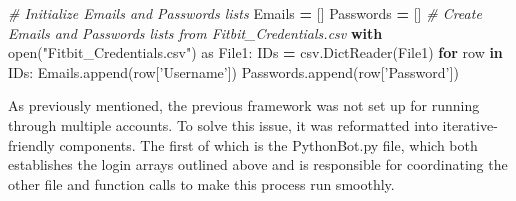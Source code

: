 \documentclass[]{book}
\newenvironment{Shaded}{\begin{snugshade}}{\end{snugshade}}
\newcommand{\KeywordTok}[1]{\textcolor[rgb]{0.13,0.29,0.53}{\textbf{#1}}}
\newcommand{\StringTok}[1]{\textcolor[rgb]{0.31,0.60,0.02}{#1}}
\newcommand{\ImportTok}[1]{#1}
\newcommand{\CommentTok}[1]{\textcolor[rgb]{0.56,0.35,0.01}{\textit{#1}}}
\newcommand{\ControlFlowTok}[1]{\textcolor[rgb]{0.13,0.29,0.53}{\textbf{#1}}}
\newcommand{\OperatorTok}[1]{\textcolor[rgb]{0.81,0.36,0.00}{\textbf{#1}}}
\newcommand{\BuiltInTok}[1]{#1}
\newcommand{\NormalTok}[1]{#1}
\begin{document}
\begin{Shaded}
\begin{Highlighting}[]
\CommentTok{# Initialize Emails and Passwords lists}
\NormalTok{Emails }\OperatorTok{=}\NormalTok{ []}
\NormalTok{Passwords }\OperatorTok{=}\NormalTok{ []}
\CommentTok{# Create Emails and Passwords lists from Fitbit_Credentials.csv}
\ControlFlowTok{with} \BuiltInTok{open}\NormalTok{(}\StringTok{"Fitbit_Credentials.csv"}\NormalTok{) }\ImportTok{as}\NormalTok{ File1:}
\NormalTok{    IDs }\OperatorTok{=}\NormalTok{ csv.DictReader(File1)}
    \ControlFlowTok{for}\NormalTok{ row }\KeywordTok{in}\NormalTok{ IDs:}
\NormalTok{        Emails.append(row[}\StringTok{'Username'}\NormalTok{])}
\NormalTok{        Passwords.append(row[}\StringTok{'Password'}\NormalTok{])}
\end{Highlighting}
\end{Shaded}

As previously mentioned, the previous framework was not set up for
running through multiple accounts. To solve this issue, it was
reformatted into iterative-friendly components. The first of which is
the PythonBot.py file, which both establishes the login arrays outlined
above and is responsible for coordinating the other file and function
calls to make this process run smoothly.
\end{document}

